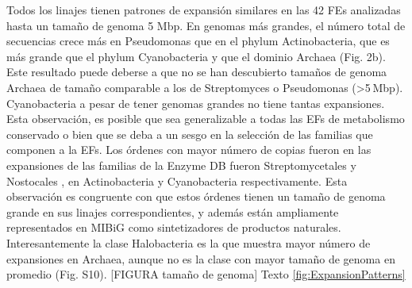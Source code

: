 \documentclass[12pt,twoside]{reedthesis}
\begin{document}
  Todos los linajes tienen patrones de expansión similares en las 42 FEs
  analizadas hasta un tamaño de genoma 5 Mbp. En genomas más grandes, el
  número total de secuencias crece más en Pseudomonas que en el phylum
  Actinobacteria, que es más grande que el phylum Cyanobacteria y que el
  dominio Archaea (Fig. 2b). Este resultado puede deberse a que no se han
  descubierto tamaños de genoma Archaea de tamaño comparable a los de
  Streptomyces o Pseudomonas (\textgreater{}5 Mbp). Cyanobacteria a pesar
  de tener genomas grandes no tiene tantas expansiones. Esta observación,
  es posible que sea generalizable a todas las EFs de metabolismo
  conservado o bien que se deba a un sesgo en la selección de las familias
  que componen a la EFs. Los órdenes con mayor número de copias fueron en
  las expansiones de las familias de la Enzyme DB fueron Streptomycetales
  y Nostocales , en Actinobacteria y Cyanobacteria respectivamente. Esta
  observación es congruente con que estos órdenes tienen un tamaño de
  genoma grande en sus linajes correspondientes, y además están
  ampliamente representados en MIBiG como sintetizadores de productos
  naturales. Interesantemente la clase Halobacteria es la que muestra
  mayor número de expansiones en Archaea, aunque no es la clase con mayor
  tamaño de genoma en promedio (Fig. S10). {[}FIGURA tamaño de genoma{]}
  Texto \autoref{fig:ExpansionPatterns}
  
\end{document}
